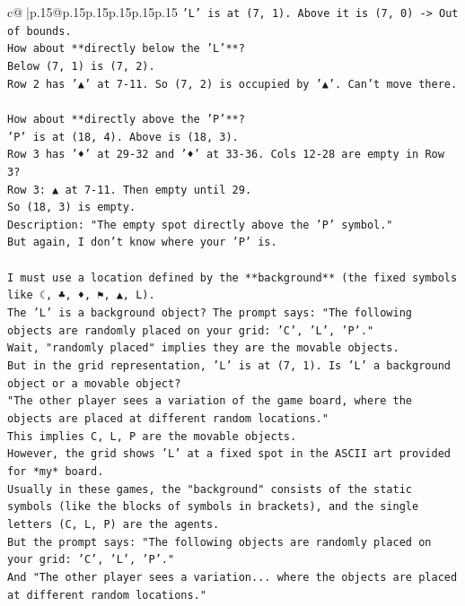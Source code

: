 \documentclass{article}
\begin{document}
{\begin{supertabular}{c@{$\;$}|p{.15\linewidth}@{}p{.15\linewidth}p{.15\linewidth}p{.15\linewidth}p{.15\linewidth}p{.15\linewidth}}
{{{\texttt{'L' is at (7, 1). Above it is (7, 0) {-}> Out of bounds.} \\
\texttt{How about **directly below the 'L'**?} \\
\texttt{Below (7, 1) is (7, 2).} \\
\texttt{Row 2 has '▲' at 7{-}11. So (7, 2) is occupied by '▲'. Can't move there.} \\
\\ 
\texttt{How about **directly above the 'P'**?} \\
\texttt{'P' is at (18, 4). Above is (18, 3).} \\
\texttt{Row 3 has '♦' at 29{-}32 and '♦' at 33{-}36. Cols 12{-}28 are empty in Row 3?} \\
\texttt{Row 3: ▲ at 7{-}11. Then empty until 29.} \\
\texttt{So (18, 3) is empty.} \\
\texttt{Description: "The empty spot directly above the 'P' symbol."} \\
\texttt{But again, I don't know where your 'P' is.} \\
\\ 
\texttt{I must use a location defined by the **background** (the fixed symbols like ☾, ♣, ♦, ⚑, ▲, L).} \\
\texttt{The 'L' is a background object? The prompt says: "The following objects are randomly placed on your grid: 'C', 'L', 'P'."} \\
\texttt{Wait, "randomly placed" implies they are the movable objects.} \\
\texttt{But in the grid representation, 'L' is at (7, 1). Is 'L' a background object or a movable object?} \\
\texttt{"The other player sees a variation of the game board, where the objects are placed at different random locations."} \\
\texttt{This implies C, L, P are the movable objects.} \\
\texttt{However, the grid shows 'L' at a fixed spot in the ASCII art provided for *my* board.} \\
\texttt{Usually in these games, the "background" consists of the static symbols (like the blocks of symbols in brackets), and the single letters (C, L, P) are the agents.} \\
\texttt{But the prompt says: "The following objects are randomly placed on your grid: 'C', 'L', 'P'."} \\
\texttt{And "The other player sees a variation... where the objects are placed at different random locations."} \\
}}}
\end{supertabular}}
\end{document}
